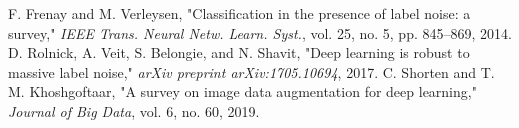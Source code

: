 \documentclass[10pt,twocolumn,letterpaper]{article}
\begin{document}
\begin{thebibliography}{9}
    F. Frenay and M. Verleysen,
    "Classification in the presence of label noise: a survey," 
    \textit{IEEE Trans. Neural Netw. Learn. Syst.}, vol. 25, no. 5, pp. 845--869, 2014.
    D. Rolnick, A. Veit, S. Belongie, and N. Shavit,
    "Deep learning is robust to massive label noise," 
    \textit{arXiv preprint arXiv:1705.10694}, 2017.
    C. Shorten and T. M. Khoshgoftaar,
    "A survey on image data augmentation for deep learning," 
    \textit{Journal of Big Data}, vol. 6, no. 60, 2019.
    
\end{thebibliography}
\end{document}
